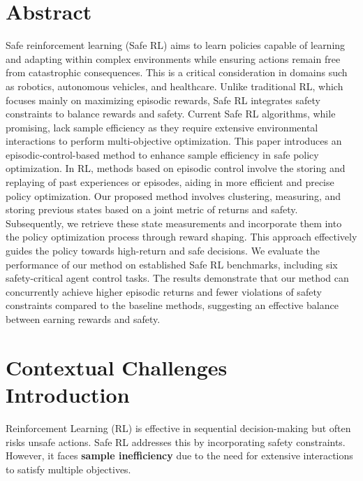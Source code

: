\section{Abstract}  
Safe reinforcement learning (Safe RL) aims to learn policies capable of learning and adapting within complex environments while ensuring actions remain free from catastrophic consequences. This is a critical consideration in domains such as robotics, autonomous vehicles, and healthcare. Unlike traditional RL, which focuses mainly on maximizing episodic rewards, Safe RL integrates safety constraints to balance rewards and safety. Current Safe RL algorithms, while promising, lack sample efficiency as they require extensive environmental interactions to perform multi-objective optimization. This paper introduces an episodic-control-based method to enhance sample efficiency in safe policy optimization. In RL, methods based on episodic control involve the storing and replaying of past experiences or episodes, aiding in more efficient and precise policy optimization. Our proposed method involves clustering, measuring, and storing previous states based on a joint metric of returns and safety. Subsequently, we retrieve these state measurements and incorporate them into the policy optimization process through reward shaping. This approach effectively guides the policy towards high-return and safe decisions. We evaluate the performance of our method on established Safe RL benchmarks, including six safety-critical agent control tasks. The results demonstrate that our method can concurrently achieve higher episodic returns and fewer violations of safety constraints compared to the baseline methods, suggesting an effective balance between earning rewards and safety.



%
%
%		
    

\section{Contextual Challenges Introduction}
Reinforcement Learning (RL) is effective in sequential decision-making but often risks unsafe actions. Safe RL addresses this by incorporating safety constraints. However, it faces \textbf{sample inefficiency} due to the need for extensive interactions to satisfy multiple objectives.
